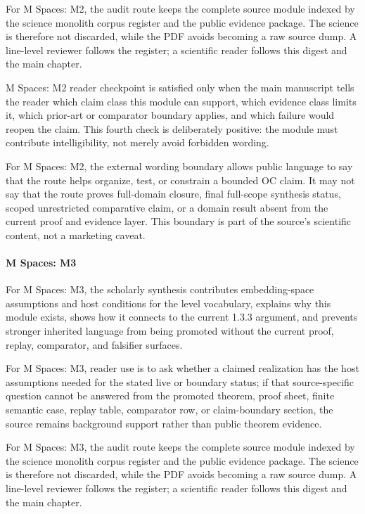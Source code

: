 For M Spaces: M2, the audit route keeps the complete source module indexed by the science monolith corpus register and the public evidence package. The science is therefore not discarded, while the PDF avoids becoming a raw source dump. A line-level reviewer follows the register; a scientific reader follows this digest and the main chapter.


M Spaces: M2 reader checkpoint is satisfied only when the main manuscript tells the reader which claim class this module can support, which evidence class limits it, which prior-art or comparator boundary applies, and which failure would reopen the claim. This fourth check is deliberately positive: the module must contribute intelligibility, not merely avoid forbidden wording.


For M Spaces: M2, the external wording boundary allows public language to say that the route helps organize, test, or constrain a bounded OC claim. It may not say that the route proves full-domain closure, final full-scope synthesis status, scoped unrestricted comparative claim, or a domain result absent from the current proof and evidence layer. This boundary is part of the source's scientific content, not a marketing caveat.


\paragraph{M Spaces: M3}

For M Spaces: M3, the scholarly synthesis contributes embedding-space assumptions and host conditions for the level vocabulary, explains why this module exists, shows how it connects to the current 1.3.3 argument, and prevents stronger inherited language from being promoted without the current proof, replay, comparator, and falsifier surfaces.


For M Spaces: M3, reader use is to ask whether a claimed realization has the host assumptions needed for the stated live or boundary status; if that source-specific question cannot be answered from the promoted theorem, proof sheet, finite semantic case, replay table, comparator row, or claim-boundary section, the source remains background support rather than public theorem evidence.


For M Spaces: M3, the audit route keeps the complete source module indexed by the science monolith corpus register and the public evidence package. The science is therefore not discarded, while the PDF avoids becoming a raw source dump. A line-level reviewer follows the register; a scientific reader follows this digest and the main chapter.


